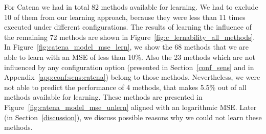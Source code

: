 For Catena we had in total 82 methods available for learning. We had to exclude 10 of them from our learning approach, because they were less than 11 times executed under different configurations. The results of learning the influence of the remaining 72 methods are shown in Figure~\ref{fig:c_lernability_all_methods}. In Figure~\ref{fig:catena_model_mse_lern}, we show the 68 methods that we are able to learn with an \ac{MSE} of less than 10\%. Also the 23 methods which are not influenced by any configuration option (presented in Section~\ref{conf_sens} and in Appendix~\ref{app:conf:sens:catena}) belong to those methods. Nevertheless, we were not able to predict the performance of 4 methods, that makes 5.5\% out of all methods available for learning. These methods are presented in Figure~\ref{fig:catena_model_mse_unlern} aligned with an logarithmic \ac{MSE}. Later (in Section~\ref{discussion}), we discuss possible reasons why we could not learn these methods.

